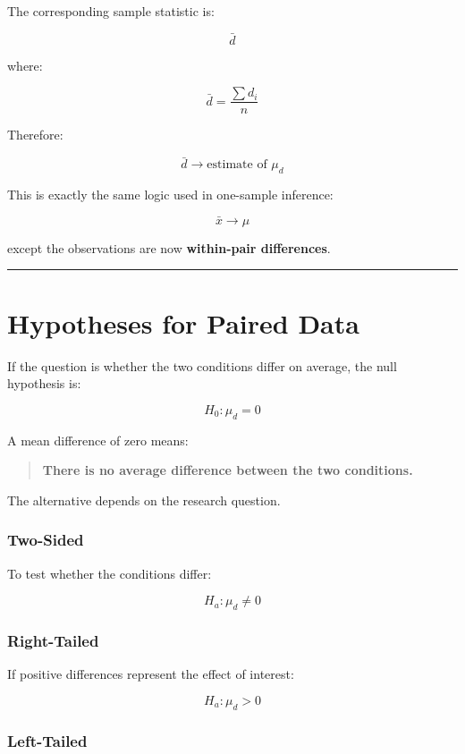 \documentclass[
  letterpaper,
  DIV=11,
  numbers=noendperiod]{scrreprt}
\begin{document}
The corresponding sample statistic is:

\[
\boxed{\bar{d}}
\]

where:

\[
\bar{d}
=
\frac{\sum d_i}{n}
\]

Therefore:

\[
\bar{d}
\rightarrow
\text{estimate of }
\mu_d
\]

This is exactly the same logic used in one-sample inference:

\[
\bar{x}\rightarrow\mu
\]

except the observations are now \textbf{within-pair differences}.

\begin{center}\rule{0.5\linewidth}{0.5pt}\end{center}


\chapter{Hypotheses for Paired Data}\label{hypotheses-for-paired-data}

If the question is whether the two conditions differ on average, the
null hypothesis is:

\[
H_0:\mu_d=0
\]

A mean difference of zero means:

\begin{quote}
\textbf{There is no average difference between the two conditions.}
\end{quote}

The alternative depends on the research question.

\subsection{Two-Sided}\label{two-sided}

To test whether the conditions differ:

\[
H_a:\mu_d\neq0
\]

\subsection{Right-Tailed}\label{right-tailed}

If positive differences represent the effect of interest:

\[
H_a:\mu_d>0
\]

\subsection{Left-Tailed}\label{left-tailed}
\end{document}
